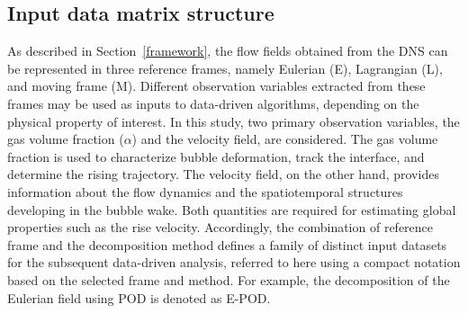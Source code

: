 \documentclass[a4paper,fleqn]{cas-sc}
\begin{document}
	\subsection{Input data matrix structure}
	
	As described in Section~\ref{framework}, the flow fields obtained from the DNS can be represented in three reference frames, namely Eulerian (E), Lagrangian (L), and moving frame (M). Different observation variables extracted from these frames may be used as inputs to data-driven algorithms, depending on the physical property of interest. In this study, two primary observation variables, the gas volume fraction ($\alpha$) and the velocity field, are considered. The gas volume fraction is used to characterize bubble deformation, track the interface, and determine the rising trajectory. The velocity field, on the other hand, provides information about the flow dynamics and the spatiotemporal structures developing in the bubble wake. Both quantities are required for estimating global properties such as the rise velocity. 	Accordingly, the combination of reference frame and the decomposition method defines a family of distinct input datasets for the subsequent data-driven analysis, referred to here using a compact notation based on the selected frame and method. For example, the decomposition of the Eulerian field using POD is denoted as E-POD.
	
\end{document}
